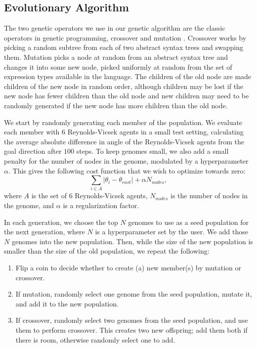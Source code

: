 \subsection{Evolutionary Algorithm}
\label{sec:evolutionaryalg}
The two genetic operators we use in our genetic algorithm are the classic
operators in genetic programming, crossover and mutation \cite{deCastro2007}.
Crossover works by picking a random subtree from each of two abstract syntax
trees and swapping them.
Mutation picks a node at random from an abstract syntax tree and changes it
into some new node, picked uniformly at random from the set of expression types
available in the language.
The children of the old node are made children of the new node in random order,
although children may be lost if the new node has fewer children than the old
node and new children may need to be randomly generated if the new node has
more children than the old node.

We start by randomly generating each member of the population.
We evaluate each member with $6$ Reynolds-Vicsek agents in a small test setting,
calculating the average absolute difference in angle of the Reynolds-Vicsek
agents from the goal direction after $100$ steps.
To keep genomes small, we also add a small penalty for the number of nodes in
the genome, modulated by a hyperparameter $\alpha$.
This gives the following cost function that we wish to optimize towards zero:
\[ \sum_{i\in A} |\theta_i - \theta_{east}| + \alpha N_{nodes}, \]
where $A$ is the set of $6$ Reynolds-Vicsek agents, $N_{nodes}$ is the number
of nodes in the genome, and $\alpha$ is a regularization factor.

In each generation, we choose the top $N$ genomes to use as a seed population
for the next generation, where $N$ is a hyperparameter set by the user.
We add those $N$ genomes into the new population.
Then, while the size of the new population is smaller than the size of the
old population, we repeat the following:
\begin{enumerate}
    \item Flip a coin to decide whether to create (a) new member(s) by mutation
    or crossover.
    \item If mutation, randomly select one genome from the seed population,
    mutate it, and add it to the new population.
    \item If crossover, randomly select two genomes from the seed population,
    and use them to perform crossover.
    This creates two new offspring; add them both if there is room, otherwise
    randomly select one to add.
\end{enumerate}

